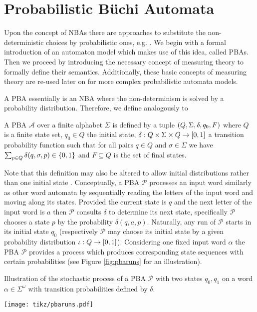 \section{Probabilistic Büchi Automata}
Upon the concept of \acp{NBA} there are approaches to substitute the
non-deterministic choices by probabilistic ones, e.g.
\cite{RecOmeLangProbAuto,DecProblemsForProbAuto,Groesser}. We begin with
a formal introduction of an automaton model which makes use of this idea,
called \aclp{PBA}. Then we proceed by introducing the necessary concept of
measuring theory to formally define their semantics. Additionally, these basic
concepts of measuring theory are re-used later on for more complex
probabilistic automata models.

A \ac{PBA} essentially is an \ac{NBA} where the non-determinism is solved by a
probability distribution. Therefore, we define analogously to 
\cite{Groesser}
\begin{definition}
  A \acl{PBA} $\mathcal{A}$ over a finite alphabet $\Sigma$ is defined by a
  tuple $\left(Q, \Sigma, \delta, q_{0}, F\right)$ where $Q$ is a finite state set,
  $q_{0}\in Q$ the initial state,
    $\delta:Q\times\Sigma\times Q\rightarrow \left[0,1\right]$
  a transition probability function such that for all pairs $q\in Q$ and
  $\sigma\in\Sigma$ we have $\sum_{p\in Q}\delta(q,\sigma,p)\in\left\{0,1\right\}$
  and $F\subseteq Q$ is the set of final states.
\end{definition}
Note that this definition may also be altered to allow initial distributions
rather than one initial state \cite{RecOmeLangProbAuto}. Conceptually, a
\ac{PBA} $\mathcal{P}$ processes an input word similarly as other word automata
by sequentially reading the letters of the input word and moving along its
states. Provided the current state is $q$ and the next letter of the input word 
is $a$ then $\mathcal{P}$ consults $\delta$ to determine its next state,
specifically $\mathcal{P}$ chooses a state $p$ by the probability
$\delta(q,a,p)$. Naturally, any run of $\mathcal{P}$ starts in its initial
state $q_{0}$ (respectively $\mathcal{P}$ may choose its initial state by a
given probability distribution $\iota:Q\rightarrow\left[0,1\right]$). Considering
one fixed input word $\alpha$ the \ac{PBA} $\mathcal{P}$ provides a process
which produces corresponding state sequences with certain probabilities (see
Figure \ref{fig:pbaruns} for an illustration).
\begin{drawing}
  \caption{Illustration of the stochastic process of a \ac{PBA} $\mathcal{P}$
  with two states $q_{0}, q_{1}$ on a word $\alpha\in\Sigma^{\omega}$ with
  transition probabilities defined by $\delta$.}
  \label{fig:pbaruns}
  \begin{center}
    \texttt{[image: tikz/pbaruns.pdf]}
  \end{center}
\end{drawing}
